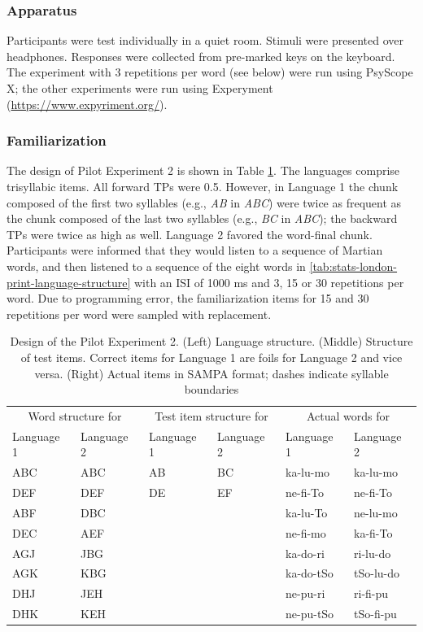 \documentclass[]{article}
\begin{document}
\subsubsection{Apparatus}

Participants were test individually in a quiet room. Stimuli were presented over headphones. Responses were collected from pre-marked keys on the keyboard. The experiment with 3 repetitions per word (see below) were run using PsyScope X; the other experiments were run using Experyment (\url{https://www.expyriment.org/}).

\subsubsection{Familiarization}

The design of Pilot Experiment 2 is shown in Table \ref{tab:bcn-print-language-structure}. The languages comprise trisyllabic items. All forward TPs were 0.5. However, in Language 1 the chunk composed of the first two syllables (e.g., \emph{AB} in \emph{ABC}) were twice as frequent as the chunk composed of the last two syllables (e.g., \emph{BC} in \emph{ABC}); the backward TPs were twice as high as well. Language 2 favored the word-final chunk. Participants were informed that they would listen to a sequence of Martian words, and then listened to a sequence of the eight words in \ref{tab:stats-london-print-language-structure} with an ISI of 1000 ms and 3, 15 or 30 repetitions per word. Due to programming error, the familiarization items for 15 and 30 repetitions per word were sampled with replacement.

\begin{table}

\caption{\label{tab:bcn-print-language-structure}Design of the Pilot Experiment 2. (Left) Language structure. (Middle) Structure of test items. Correct items for Language 1 are foils for Language 2 and vice versa. (Right) Actual items in SAMPA format; dashes indicate syllable boundaries}
\centering
\begin{tabular}[t]{llllll}
\toprule
\multicolumn{2}{c}{Word structure for} & \multicolumn{2}{c}{Test item structure for} & \multicolumn{2}{c}{Actual words for} \\
Language 1 & Language 2 & Language 1 & Language 2 & Language 1 & Language 2\\
\midrule
ABC & ABC & AB & BC & ka-lu-mo & ka-lu-mo\\
DEF & DEF & DE & EF & ne-fi-To & ne-fi-To\\
ABF & DBC &  &  & ka-lu-To & ne-lu-mo\\
DEC & AEF &  &  & ne-fi-mo & ka-fi-To\\
AGJ & JBG &  &  & ka-do-ri & ri-lu-do\\
\addlinespace
AGK & KBG &  &  & ka-do-tSo & tSo-lu-do\\
DHJ & JEH &  &  & ne-pu-ri & ri-fi-pu\\
DHK & KEH &  &  & ne-pu-tSo & tSo-fi-pu\\
\bottomrule
\end{tabular}
\end{table}
\end{document}
